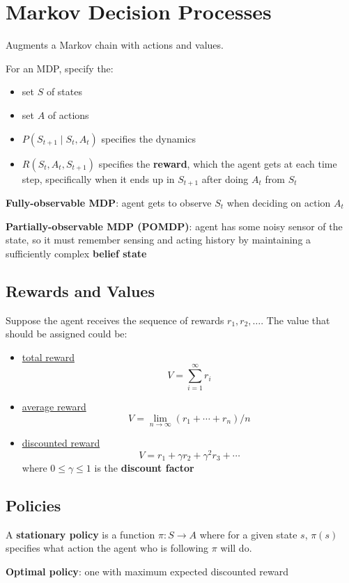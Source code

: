 \documentclass[11pt]{article}
\begin{document}
\section{Markov Decision Processes}
\label{sec:orgd36fb80}
Augments a Markov chain with actions and values.

For an MDP, specify the:
\begin{itemize}
\item set \(S\) of states
\item set \(A\) of actions
\item \(P(S_{t+1} \mid S_{t}, A_{t})\) specifies the dynamics
\item \(R(S_{t}, A_{t}, S_{t+1})\) specifies the \textbf{reward}, which the agent gets at
each time step, specifically when it ends up in \(S_{t+1}\) after doing \(A_{t}\)
from \(S_{t}\)
\end{itemize}

\textbf{Fully-observable MDP}: agent gets to observe \(S_{t}\) when deciding on action \(A_{t}\)

\textbf{Partially-observable MDP (POMDP)}: agent has some noisy sensor of the state, so it
must remember sensing and acting history by maintaining a sufficiently complex
\textbf{belief state}
\subsection{Rewards and Values}
\label{sec:org686c1f7}
Suppose the agent receives the sequence of rewards \(r_{1}, r_{2}, \dots\).
The value that should be assigned could be:
\begin{itemize}
\item \uline{total reward}
$$ V = \sum_{i=1}^{\infty} r_{i} $$
\item \uline{average reward}
$$V = \lim_{n \to \infty} (r_{1} + \cdots + r_{n}) / n$$
\item \uline{discounted reward}
$$V = r_{1} + \gamma r_{2} + \gamma^{2} r_{3} + \cdots$$
where \(0 \le \gamma \le 1\) is the \textbf{discount factor}
\end{itemize}
\subsection{Policies}
\label{sec:org38b1d6e}
A \textbf{stationary policy} is a function \(\pi : S \to A\) where for a given state \(s\),
\(\pi(s)\) specifies what action the agent who is following \(\pi\) will do.

\textbf{Optimal policy}: one with maximum expected discounted reward
\end{document}

